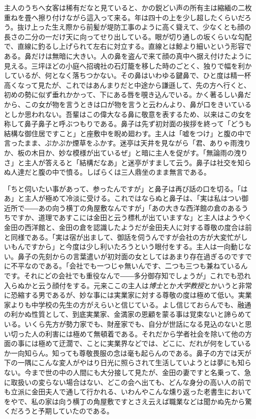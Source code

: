 \documentclass[12pt, openright]{book}
\begin{document}
主人のうちへ女客は稀有だなと見ていると、かの鋭どい声の所有主は縮緬の二枚重ねを畳へ擦り付けながら這入って来る。年は四十の上を少し超したくらいだろう。抜け上った生え際から前髪が堤防工事のように高く聳えて、少なくとも顔の長さの二分の一だけ天に向ってせり出している。眼が切り通しの坂くらいな勾配で、直線に釣るし上げられて左右に対立する。直線とは鯨より細いという形容である。鼻だけは無暗に大きい。人の鼻を盗んで来て顔の真中へ据え付けたように見える。三坪ほどの小庭へ招魂社の石灯籠を移した時のごとく、独りで幅を利かしているが、何となく落ちつかない。その鼻はいわゆる鍵鼻で、ひと度は精一杯高くなって見たが、これではあんまりだと中途から謙遜して、先の方へ行くと、初めの勢に似ず垂れかかって、下にある唇を覗き込んでいる。かく著るしい鼻だから、この女が物を言うときは口が物を言うと云わんより、鼻が口をきいているとしか思われない。吾輩はこの偉大なる鼻に敬意を表するため、以来はこの女を称して鼻子鼻子と呼ぶつもりである。鼻子は先ず初対面の挨拶を終って「どうも結構な御住居ですこと」と座敷中を睨め廻わす。主人は「嘘をつけ」と腹の中で言ったまま、ぷかぷか煙草をふかす。迷亭は天井を見ながら「君、ありゃ雨洩りか、板の木目か、妙な模様が出ているぜ」と暗に主人を促がす。「無論雨の洩りさ」と主人が答えると「結構だなあ」と迷亭がすまして云う。鼻子は社交を知らぬ人達だと腹の中で憤る。しばらくは三人鼎坐のまま無言である。

「ちと伺いたい事があって、参ったんですが」と鼻子は再び話の口を切る。「はあ」と主人が極めて冷淡に受ける。これではならぬと鼻子は、「実は私はつい御近所で――あの向う横丁の角屋敷なんですが」「あの大きな西洋館の倉のあるうちですか、道理であすこには金田と云う標札が出ていますな」と主人はようやく金田の西洋館と、金田の倉を認識したようだが金田夫人に対する尊敬の度合は前と同様である。「実は宿が出まして、御話を伺うんですが会社の方が大変忙がしいもんですから」と今度は少し利いたろうという眼付をする。主人は一向動じない。鼻子の先刻からの言葉遣いが初対面の女としてはあまり存在過ぎるのですでに不平なのである。「会社でも一つじゃ無いんです、二つも三つも兼ねているんです。それにどの会社でも重役なんで――多分御存知でしょうが」これでも恐れ入らぬかと云う顔付をする。元来ここの主人は\emph{博士}とか\emph{大学教授}とかいうと非常に恐縮する男であるが、妙な事には実業家に対する尊敬の度は極めて低い。実業家よりも中学校の先生の方がえらいと信じている。よし信じておらんでも、融通の利かぬ性質として、到底実業家、金満家の恩顧を蒙る事は覚束ないと諦らめている。いくら先方が勢力家でも、財産家でも、自分が世話になる見込のないと思い切った人の利害には極めて無頓着である。それだから学者社会を除いて他の方面の事には極めて迂濶で、ことに実業界などでは、どこに、だれが何をしているか一向知らん。知っても尊敬畏服の念は毫も起らんのである。鼻子の方では天が下の一隅にこんな変人がやはり日光に照らされて生活していようとは夢にも知らない。今まで世の中の人間にも大分接して見たが、金田の妻ですと名乗って、急に取扱いの変らない場合はない、どこの会へ出ても、どんな身分の高い人の前でも立派に金田夫人で通して行かれる、いわんやこんな燻り返った老書生においてをやで、私の家は向う横丁の角屋敷ですとさえ云えば職業などは聞かぬ先から驚くだろうと予期していたのである。
\end{document}
